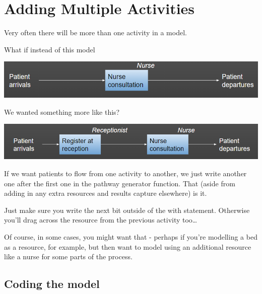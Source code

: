 \documentclass[
  letterpaper,
  DIV=11,
  numbers=noendperiod]{scrreprt}
\begin{document}
\chapter{Adding Multiple Activities}\label{adding-multiple-activities}

Very often there will be more than one activity in a model.

What if instead of this model

\includegraphics{images/example_simplest_model.png}

We wanted something more like this?

\includegraphics{images/example_simple_model_sequential.png}

If we want patients to flow from one activity to another, we just write
another one after the first one in the pathway generator function. That
(aside from adding in any extra resources and results capture elsewhere)
is it.

\begin{tcolorbox}[enhanced jigsaw, colframe=quarto-callout-warning-color-frame, bottomtitle=1mm, breakable, rightrule=.15mm, coltitle=black, colbacktitle=quarto-callout-warning-color!10!white, opacityback=0, leftrule=.75mm, arc=.35mm, toptitle=1mm, title=\textcolor{quarto-callout-warning-color}{\faExclamationTriangle}\hspace{0.5em}{Warning}, titlerule=0mm, colback=white, toprule=.15mm, bottomrule=.15mm, left=2mm, opacitybacktitle=0.6]

Just make sure you write the next bit outside of the with statement.
Otherwise you'll drag across the resource from the previous activity
too\ldots{}

Of course, in some cases, you might want that - perhaps if you're
modelling a bed as a resource, for example, but then want to model using
an additional resource like a nurse for some parts of the process.

\end{tcolorbox}

\section{Coding the model}\label{coding-the-model}
\end{document}
